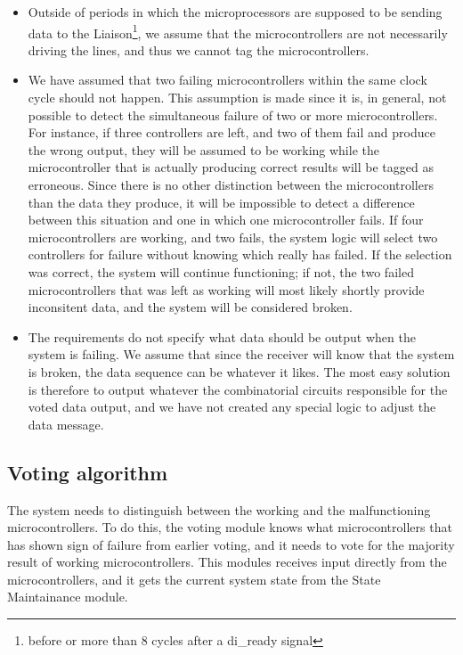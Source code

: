 \begin{itemize}
\item Outside of periods in which the microprocessors are supposed to
  be sending data to the Liaison\footnote{before or more than 8
    cycles after a {\ttfamily di\_ready} signal}, we assume that the
  microcontrollers are not necessarily driving the lines, and thus we
  cannot tag the microcontrollers.

\item We have assumed that two failing microcontrollers within the
  same clock cycle should not happen. This assumption is made since it
  is, in general, not possible to detect the simultaneous failure of
  two or more microcontrollers. For instance, if three controllers are
  left, and two of them fail and produce the wrong output, they will
  be assumed to be working while the microcontroller that is actually
  producing correct results will be tagged as erroneous. Since there
  is no other distinction between the microcontrollers than the data
  they produce, it will be impossible to detect a difference between
  this situation and one in which one microcontroller fails. If four
  microcontrollers are working, and two fails, the system logic will
  select two controllers for failure without knowing which really has
  failed. If the selection was correct, the system will continue
  functioning; if not, the two failed microcontrollers that was left
  as working will most likely shortly provide inconsitent data, and
  the system will be considered broken.

\item The requirements do not specify what data should be output when
  the system is failing. We assume that since the receiver will know
  that the system is broken, the data sequence can be whatever it
  likes. The most easy solution is therefore to output whatever the
  combinatorial circuits responsible for the voted data output, and we
  have not created any special logic to adjust the data message.

\end{itemize}


\subsection{Voting algorithm}
\label{sec:votingalgorithm}
The system needs to distinguish between the working and the
malfunctioning microcontrollers. To do this, the voting module knows
what microcontrollers that has shown sign of failure from earlier
voting, and it needs to vote for the majority result of working
microcontrollers. This modules receives input directly from the
microcontrollers, and it gets the current system state from the State
Maintainance module.

